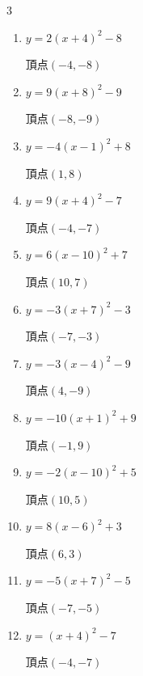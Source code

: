 \begin{multicols}{3}
\begin{enumerate}
  \item $\displaystyle y=2\left( x+4\right)^{2}-8$

        $\displaystyle 頂点\left( -4 , -8 \right)$

  \item $\displaystyle y=9\left( x+8\right)^{2}-9$

        $\displaystyle 頂点\left( -8 , -9 \right)$

  \item $\displaystyle y=-4\left( x-1\right)^{2}+8$

        $\displaystyle 頂点\left( 1 , 8 \right)$

  \item $\displaystyle y=9\left( x+4\right)^{2}-7$

        $\displaystyle 頂点\left( -4 , -7 \right)$

  \item $\displaystyle y=6\left( x-10\right)^{2}+7$

        $\displaystyle 頂点\left( 10 , 7 \right)$

  \item $\displaystyle y=-3\left( x+7\right)^{2}-3$

        $\displaystyle 頂点\left( -7 , -3 \right)$

  \item $\displaystyle y=-3\left( x-4\right)^{2}-9$

        $\displaystyle 頂点\left( 4 , -9 \right)$

  \item $\displaystyle y=-10\left( x+1\right)^{2}+9$

        $\displaystyle 頂点\left( -1 , 9 \right)$

  \item $\displaystyle y=-2\left( x-10\right)^{2}+5$

        $\displaystyle 頂点\left( 10 , 5 \right)$

  \item $\displaystyle y=8\left( x-6\right)^{2}+3$

        $\displaystyle 頂点\left( 6 , 3 \right)$

  \item $\displaystyle y=-5\left( x+7\right)^{2}-5$

        $\displaystyle 頂点\left( -7 , -5 \right)$

  \item $\displaystyle y=\left( x+4\right)^{2}-7$

        $\displaystyle 頂点\left( -4 , -7 \right)$


\end{enumerate}
\end{multicols}
